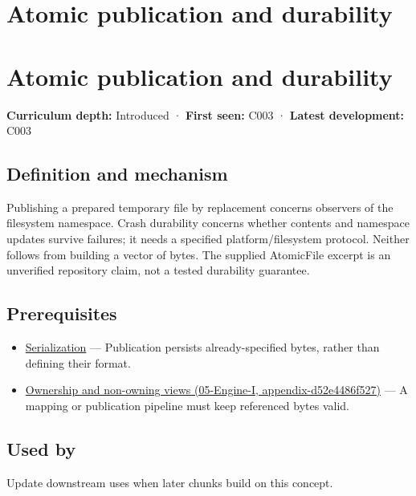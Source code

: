 \hypertarget{appendix-e89a8f290ef5}{}
\section*{Atomic publication and durability}
\section{Atomic publication and durability}\label{appendix-e89a8f290ef5-atomic-publication-and-durability}

\textbf{Curriculum depth:} Introduced · \textbf{First seen:} C003 · \textbf{Latest development:} C003

\subsection{Definition and mechanism}\label{appendix-e89a8f290ef5-definition-and-mechanism}

Publishing a prepared temporary file by replacement concerns observers of the filesystem namespace. Crash durability concerns whether contents and namespace updates survive failures; it needs a specified platform/filesystem protocol. Neither follows from building a vector of bytes. The supplied AtomicFile excerpt is an unverified repository claim, not a tested durability guarantee.

\subsection{Prerequisites}\label{appendix-e89a8f290ef5-prerequisites}

\begin{itemize}
\tightlist
\item
  \hyperref[appendix-91d09ebed979]{Serialization} --- Publication persists already-specified bytes, rather than defining their format.
\item
  \href{../05-Engine-I/main.pdf\#nameddest=appendix-d52e4486f527}{Ownership and non-owning views (05-Engine-I, appendix-d52e4486f527)} --- A mapping or publication pipeline must keep referenced bytes valid.
\end{itemize}

\subsection{Used by}\label{appendix-e89a8f290ef5-used-by}

Update downstream uses when later chunks build on this concept.


